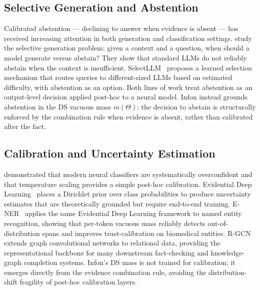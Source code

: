 \subsection{Selective Generation and Abstention}
\label{sec:related_work:selective}

Calibrated abstention — declining to answer when evidence is absent — has
received increasing attention in both generation and classification
settings.  \citet{joren2025sufficient} study the selective generation
problem: given a context and a question, when should a model generate
versus abstain?  They show that standard LLMs do not reliably abstain when
the context is insufficient.  SelectLLM~\cite{ko2024selectllm} proposes a
learned selection mechanism that routes queries to different-sized LLMs
based on estimated difficulty, with abstention as an option.  Both lines
of work treat abstention as an output-level decision applied post-hoc to a
neural model.  Infon instead grounds abstention in the DS vacuous mass
$m(\Theta)$: the decision to abstain is structurally enforced by the
combination rule when evidence is absent, rather than calibrated after the
fact.

\subsection{Calibration and Uncertainty Estimation}
\label{sec:related_work:calibration}

\citet{guo2017calibration} demonstrated that modern neural classifiers are
systematically overconfident and that temperature scaling provides a simple
post-hoc calibration.  Evidential Deep Learning~\cite{sensoy2018evidential}
places a Dirichlet prior over class probabilities to produce uncertainty
estimates that are theoretically grounded but require end-to-end training.
E-NER~\cite{zhou2023ener} applies the same Evidential Deep Learning
framework to named entity recognition, showing that per-token vacuous mass
reliably detects out-of-distribution spans and improves trust-calibration on
biomedical entities.  R-GCN~\cite{schlichtkrull2018rgcn} extends graph
convolutional networks to relational data, providing the representational
backbone for many downstream fact-checking and knowledge-graph completion
systems.  Infon's DS mass is not trained for calibration; it emerges
directly from the evidence combination rule, avoiding the distribution-shift
fragility of post-hoc calibration layers.

